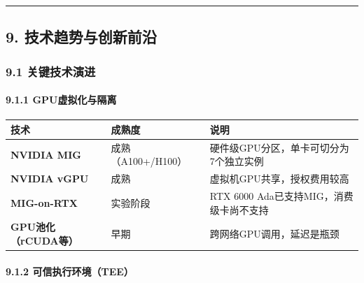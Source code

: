 \documentclass[UTF8,a4paper,12pt]{ctexart}
\begin{document}
\begin{center}\rule{0.5\linewidth}{0.5pt}\end{center}

\pagebreak

\subsection{9.
技术趋势与创新前沿}\label{ux6280ux672fux8d8bux52bfux4e0eux521bux65b0ux524dux6cbf}

\subsubsection{9.1
关键技术演进}\label{ux5173ux952eux6280ux672fux6f14ux8fdb}

\paragraph{9.1.1
GPU虚拟化与隔离}\label{gpuux865aux62dfux5316ux4e0eux9694ux79bb}

{\def\LTcaptype{none} %
\begin{longtable}[]{@{}
  >{\raggedright\arraybackslash}p{}
  >{\raggedright\arraybackslash}p{}
  >{\raggedright\arraybackslash}p{}@{}}
\toprule\noalign{}
\begin{minipage}[b]{\linewidth}\raggedright
技术
\end{minipage} & \begin{minipage}[b]{\linewidth}\raggedright
成熟度
\end{minipage} & \begin{minipage}[b]{\linewidth}\raggedright
说明
\end{minipage} \\
\midrule\noalign{}
\endhead
\bottomrule\noalign{}
\endlastfoot
\textbf{NVIDIA MIG} & 成熟（A100+/H100） &
硬件级GPU分区，单卡可切分为7个独立实例 \\
\textbf{NVIDIA vGPU} & 成熟 & 虚拟机GPU共享，授权费用较高 \\
\textbf{MIG-on-RTX} & 实验阶段 & RTX 6000
Ada已支持MIG，消费级卡尚不支持 \\
\textbf{GPU池化（rCUDA等）} & 早期 & 跨网络GPU调用，延迟是瓶颈 \\
\end{longtable}
}

\paragraph{9.1.2
可信执行环境（TEE）}\label{ux53efux4fe1ux6267ux884cux73afux5883tee}
\end{document}
